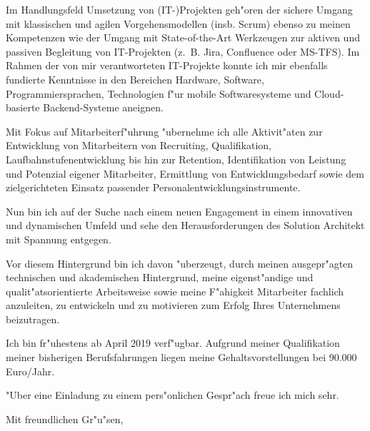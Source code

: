 \documentclass[11pt,a4paper]{dinbrief}
\begin{document}
\begin{letter}
Im Handlungsfeld Umsetzung von (IT-)Projekten geh"oren der sichere Umgang mit klassischen und agilen Vorgehensmodellen (insb. Scrum) ebenso zu meinen Kompetenzen wie der Umgang mit State-of-the-Art Werkzeugen zur aktiven und passiven Begleitung von IT-Projekten (z.~B. Jira, Confluence oder MS-TFS). Im Rahmen der von mir verantworteten IT-Projekte konnte ich mir ebenfalls fundierte Kenntnisse in den Bereichen Hardware, Software, Programmiersprachen, Technologien f"ur mobile Softwaresysteme und Cloud-basierte Backend-Systeme aneignen.

Mit Fokus auf Mitarbeiterf"uhrung "ubernehme ich alle Aktivit"aten zur Entwicklung von Mitarbeitern von Recruiting, Qualifikation, Laufbahnstufenentwicklung bis hin zur Retention, Identifikation von Leistung und Potenzial eigener Mitarbeiter, Ermittlung von Entwicklungsbedarf sowie dem zielgerichteten Einsatz passender Personalentwicklungsinstrumente.

Nun bin ich auf der Suche nach einem neuen Engagement in einem innovativen und dynamischen Umfeld und sehe den Herausforderungen des Solution Architekt mit Spannung entgegen.

Vor diesem Hintergrund bin ich davon "uberzeugt, durch meinen ausgepr"agten technischen und akademischen Hintergrund, meine eigenst"andige und qualit"atsorientierte Arbeitsweise sowie meine F"ahigkeit Mitarbeiter fachlich anzuleiten, zu entwickeln und zu motivieren zum Erfolg Ihres Unternehmens beizutragen.

Ich bin fr"uhestens ab April 2019 verf"ugbar. Aufgrund meiner Qualifikation meiner bisherigen Berufsfahrungen liegen meine Gehaltsvorstellungen bei 90.000 Euro/Jahr. 

"Uber eine Einladung zu einem pers"onlichen Gespr"ach freue ich mich sehr.

\closing{Mit freundlichen Gr"u"sen,}
\end{letter}
\end{document}
